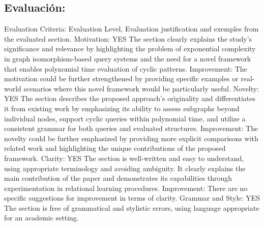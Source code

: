 \documentclass{article}%
\begin{document}
%
\subsection{Evaluación:}%
\label{subsec:Evaluacin}%
\newline%
Evaluation Criteria: Evaluation Level, Evaluation justification and exemples from the evaluated section.\newline%
\newline%
Motivation: YES\newline%
The section clearly explains the study's significance and relevance by highlighting the problem of exponential complexity in graph isomorphism{-}based query systems and the need for a novel framework that enables polynomial time evaluation of cyclic patterns.\newline%
\newline%
Improvement: The motivation could be further strengthened by providing specific examples or real{-}world scenarios where this novel framework would be particularly useful.\newline%
\newline%
Novelty: YES\newline%
The section describes the proposed approach's originality and differentiates it from existing work by emphasizing its ability to assess subgraphs beyond individual nodes, support cyclic queries within polynomial time, and utilize a consistent grammar for both queries and evaluated structures.\newline%
\newline%
Improvement: The novelty could be further emphasized by providing more explicit comparisons with related work and highlighting the unique contributions of the proposed framework.\newline%
\newline%
Clarity: YES\newline%
The section is well{-}written and easy to understand, using appropriate terminology and avoiding ambiguity. It clearly explains the main contribution of the paper and demonstrates its capabilities through experimentation in relational learning procedures.\newline%
\newline%
Improvement: There are no specific suggestions for improvement in terms of clarity.\newline%
\newline%
Grammar and Style: YES\newline%
The section is free of grammatical and stylistic errors, using language appropriate for an academic setting.\newline%
\end{document}
